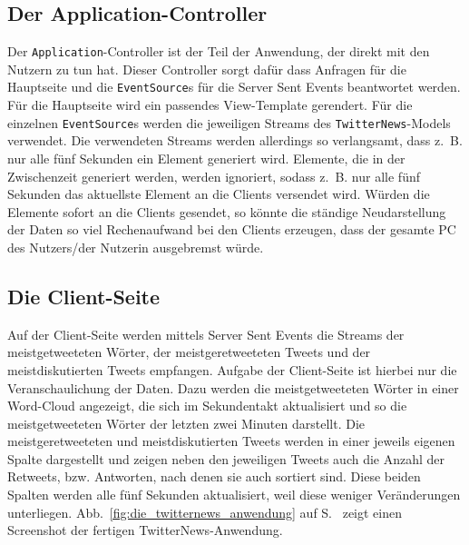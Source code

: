\subsection{Der Application-Controller} %
\label{sub:der_application_controller}

Der \lstinline|Application|-Controller ist der Teil der Anwendung, der direkt mit den Nutzern zu tun hat.
Dieser Controller sorgt dafür dass Anfragen für die Hauptseite und die \lstinline|EventSource|s für die Server Sent Events beantwortet werden.
Für die Hauptseite wird ein passendes View-Template gerendert.
Für die einzelnen \lstinline|EventSource|s werden die jeweiligen Streams des \lstinline|TwitterNews|-Models verwendet.
Die verwendeten Streams werden allerdings so verlangsamt, dass z.~B. nur alle fünf Sekunden ein Element generiert wird.
Elemente, die in der Zwischenzeit generiert werden, werden ignoriert, sodass z.~B. nur alle fünf Sekunden das aktuellste Element an die Clients versendet wird.
Würden die Elemente sofort an die Clients gesendet, so könnte die ständige Neudarstellung der Daten so viel Rechenaufwand bei den Clients erzeugen, dass der gesamte PC des Nutzers/der Nutzerin ausgebremst würde.


\subsection{Die Client-Seite} %
\label{sub:die_client_seite}

Auf der Client-Seite werden mittels Server Sent Events die Streams der meistgetweeteten Wörter, der meistgeretweeteten Tweets und der meistdiskutierten Tweets empfangen.
Aufgabe der Client-Seite ist hierbei nur die Veranschaulichung der Daten.
Dazu werden die meistgetweeteten Wörter in einer Word-Cloud angezeigt, die sich im Sekundentakt aktualisiert und so die meistgetweeteten Wörter der letzten zwei Minuten darstellt.
Die meistgeretweeteten und meistdiskutierten Tweets werden in einer jeweils eigenen Spalte dargestellt und zeigen neben den jeweiligen Tweets auch die Anzahl der Retweets, bzw. Antworten, nach denen sie auch sortiert sind.
Diese beiden Spalten werden alle fünf Sekunden aktualisiert, weil diese weniger Veränderungen unterliegen.
Abb.~\ref{fig:die_twitternews_anwendung} auf S.~\pageref{fig:die_twitternews_anwendung} zeigt einen Screenshot der fertigen TwitterNews-Anwendung.



